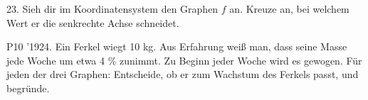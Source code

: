 \documentclass[11pt]{article}
\begin{document}
\pfgruppe{}
\begin{pfaufg}{}{23.}{}
Sieh dir im Koordinatensystem den Graphen $f$ an. Kreuze an, bei welchem Wert er die senkrechte Achse schneidet. 
\par\smallskip\noindent \begin{ksys}[xmin=0,xmax=10,ymin=0,ymax=700,xstep=1,ystep=100,xlabel=t in Jahren,ylabel=Wert,ablesen]    \end{ksys}\par
{}
\end{pfaufg}
\pfgruppe{}
\begin{pfaufg}{P10 ’19}{\llap{\textasteriskcentered\,}24.}{}
Ein Ferkel wiegt 10 kg. Aus Erfahrung weiß man, dass seine Masse jede Woche um etwa 4 \% zunimmt. Zu Beginn jeder Woche wird es gewogen. Für jeden der drei Graphen: Entscheide, ob er zum Wachstum des Ferkels passt, und begründe.

\end{pfaufg}
\end{document}
